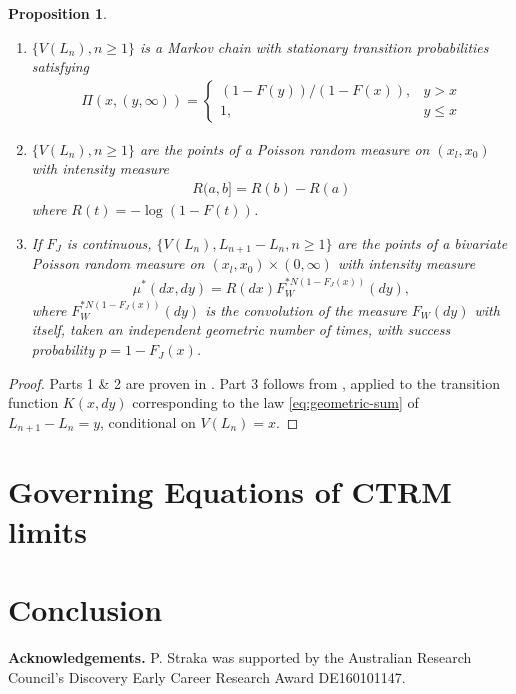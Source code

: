 \documentclass[12pt, a4paper]{article}
\newtheorem{proposition}[equation]{Proposition}
\newcommand{\1}{\mathbf 1}
\begin{document}
\begin{proposition}
\begin{enumerate}
\item
$\{V(L_n), n \ge 1\}$ is a Markov chain with stationary transition probabilities satisfying
\begin{align*}
\Pi(x, (y,\infty)) = 
\begin{cases}
(1-F(y)) / (1-F(x)), & y > x
\\
1, & y \le x
\end{cases}
\end{align*}
\item
$\{V(L_n), n \ge 1\}$ are the points of a Poisson random measure on $(x_l, x_0)$ with intensity measure
\begin{align*}
R(a,b] = R(b) - R(a)
\end{align*}
where $R(t) = -\log(1-F(t))$. 
\item
If $F_J$ is continuous, $\{V(L_n), L_{n+1} - L_n, n \ge 1\}$ are the points of a bivariate Poisson random measure on
$(x_l, x_0) \times (0,\infty)$ with intensity measure
\begin{align*}
\mu^*(dx, dy) = R(dx) F_W^{*N(1-F_J(x))}(dy),
\end{align*}
where $F_W^{*N(1-F_J(x))}(dy)$ is the convolution of the measure $F_W(dy)$ with itself, taken an independent geometric number of times, with success probability $p = 1-F_J(x)$.
\end{enumerate}
\end{proposition}

\begin{proof}
Parts 1 \& 2 are proven in 
\cite[Proposition 4.1 (i) \& (iii)]{resnick2013extreme}.
Part 3 follows from \cite[Proposition 3.8]{resnick2013extreme}, 
applied to the transition function $K(x,dy)$ corresponding to the law \eqref{eq:geometric-sum} of $L_{n+1} - L_n = y$, conditional on $V(L_n) = x$. 
\end{proof}




\section{Governing Equations of CTRM limits}




\section{Conclusion}


{\bf Acknowledgements.} P. Straka was supported by the Australian Research Council’s Discovery Early Career Research Award DE160101147.




\end{document}
